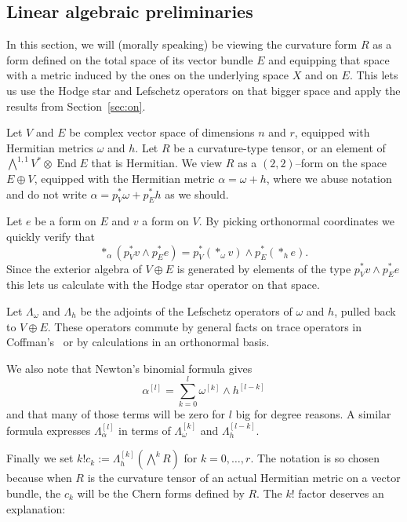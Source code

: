\documentclass[11pt,a4paper]{amsart}
\def\^#1{^{[#1]}}
\DeclareMathOperator{\End}{End}
\theoremstyle{definition}
\theoremstyle{remark}
\numberwithin{equation}{section}
\begin{document}
\subsection*{Linear algebraic preliminaries}

In this section, we will (morally speaking) be viewing the curvature form
$R$ as a form defined on the total space of its vector bundle $E$ and
equipping that space with a metric induced by the ones on the underlying
space $X$ and on $E$. This lets us use the Hodge star and Lefschetz
operators on that bigger space and apply the results from
Section~\ref{sec:on}.

Let $V$ and $E$ be complex vector space of dimensions $n$ and $r$, equipped
with Hermitian metrics $\omega$ and $h$. Let $R$ be a curvature-type
tensor, or an element of $\bigwedge^{1,1} V^* \otimes \End E$
that is Hermitian. We view $R$ as a $(2,2)$--form on the space $E \oplus
V$, equipped with the Hermitian metric $\alpha = \omega + h$, where we
abuse notation and do not write $\alpha = p_V^*\omega + p_E^*h$ as we should.

Let $e$ be a form on $E$ and $v$ a form on $V$. By picking orthonormal
coordinates we quickly verify that
$$
*_\alpha(p_V^* v \wedge p_E^* e) 
= p_V^*(*_\omega v) \wedge p_E^*(*_h e).
$$
Since the exterior algebra of $V \oplus E$ is generated by elements of the
type $p_V^* v \wedge p_E^* e$ this lets us calculate with the Hodge star
operator on that space.

Let $\Lambda_\omega$ and $\Lambda_h$ be the adjoints of the Lefschetz
operators of $\omega$ and $h$, pulled back to $V \oplus E$. These
operators commute by general facts on trace operators in
Coffman's~\cite{Coffman} or by calculations in an orthonormal basis.

We also note that Newton's binomial formula gives
$$
\alpha\^{l} = \sum_{k=0}^{l} \omega\^{k} \wedge h\^{l-k}
$$
and that many of those terms will be zero for $l$ big for degree
reasons. A similar formula expresses $\Lambda\^{l}_\alpha$ in terms of
$\Lambda\^{k}_\omega$ and $\Lambda\^{l-k}_h$.

Finally we set $k! c_k := \Lambda\^{k}_h (\bigwedge^k \! R)$ for $k = 0, \ldots,
r$.  The notation is so chosen because when $R$ is the curvature tensor of
an actual Hermitian metric on a vector bundle, the $c_k$ will be the Chern
forms defined by $R$. The $k!$ factor deserves an explanation:
\end{document}
